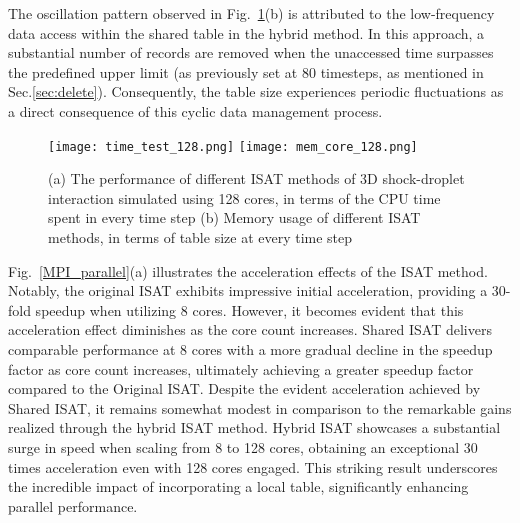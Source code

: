 
The oscillation pattern observed in Fig.~\ref{MPI_128core}(b) is attributed to the low-frequency data access within the shared table in the hybrid method. In this approach, a substantial number of records are removed when the unaccessed time surpasses the predefined upper limit (as previously set at 80 timesteps, as mentioned in Sec.\ref{sec:delete}). Consequently, the table size experiences periodic fluctuations as a direct consequence of this cyclic data management process. 


\begin{figure}[htbp] 
	\centering
	\texttt{[image: time\_test\_128.png]}
	\texttt{[image: mem\_core\_128.png]}
	\caption{(a) The performance of different ISAT methods of 3D shock-droplet interaction simulated using 128 cores, in terms of the CPU time spent in every time step (b) Memory usage of different ISAT methods, in terms of table size at every time step }\label{MPI_128core} 
\end{figure}





Fig.~\ref{MPI_parallel}(a) illustrates the acceleration effects of the ISAT method. Notably, the original ISAT exhibits impressive initial acceleration, providing a 30-fold speedup when utilizing 8 cores. However, it becomes evident that this acceleration effect diminishes as the core count increases. Shared ISAT delivers comparable performance at 8 cores with a more gradual decline in the speedup factor as core count increases, ultimately achieving a greater speedup factor compared to the Original ISAT. Despite the evident acceleration achieved by Shared ISAT, it remains somewhat modest in comparison to the remarkable gains realized through the hybrid ISAT method. Hybrid ISAT showcases a substantial surge in speed when scaling from 8 to 128 cores, obtaining an exceptional 30 times acceleration even with 128 cores engaged. This striking result underscores the incredible impact of incorporating a local table, significantly enhancing parallel performance.

